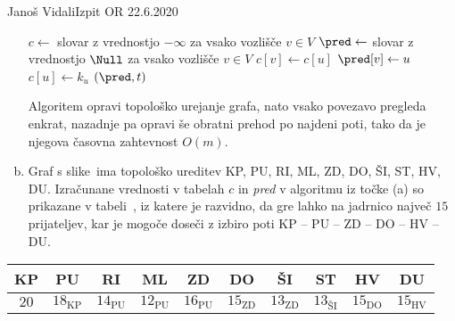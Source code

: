 \begin{naloga}{Janoš Vidali}{Izpit OR 22.6.2020}
\begin{odgovor}
\begin{enumerate}[(a)]
\needspace{\baselineskip}
\begin{small}
\begin{algorithmic}
	\State $c \gets$ slovar z vrednostjo $-\infty$ za vsako vozlišče $v \in V$
	\State $\pred \gets$ slovar z vrednostjo $\Null$ za vsako vozlišče $v \in V$
				\State $c[v] \gets c[u]$
				\State $\pred[v] \gets u$
			\EndIf
		\EndFor
            \State $c[u] \gets k_u$
        \EndIf
	\EndFor
    \State {}$(\pred, t)$
\EndFunction
\end{algorithmic}
\end{small}
Algoritem opravi topološko urejanje grafa,
nato vsako povezavo pregleda enkrat,
nazadnje pa opravi še obratni prehod po najdeni poti,
tako da je njegova časovna zahtevnost $O(m)$.

\item Graf s slike~\fig ima topološko ureditev
KP, PU, RI, ML, ZD, DO, ŠI, ST, HV, DU.
Izračunane vrednosti v tabelah $c$ in {\sl pred} v algoritmu iz točke (a)
so prikazane v tabeli~\tab,
iz katere je razvidno,
da gre lahko na jadrnico največ $15$ prijateljev,
kar je mogoče doseči z izbiro poti
KP -- PU -- ZD -- DO -- HV -- DU.
\end{enumerate}
%
\begin{tabela}
\begin{tabular}{cccccccccc}
KP & PU & RI & ML & ZD & DO & ŠI & ST & HV & DU \\
\hline
$20$ & $18_\text{KP}$ & $14_\text{PU}$ & $12_\text{PU}$ & $16_\text{PU}$ &
$15_\text{ZD}$ & $13_\text{ZD}$ & $13_\text{ŠI}$ & $15_\text{DO}$ & $15_\text{HV}$
\end{tabular}
\end{tabela}
\end{odgovor}
\end{naloga}
